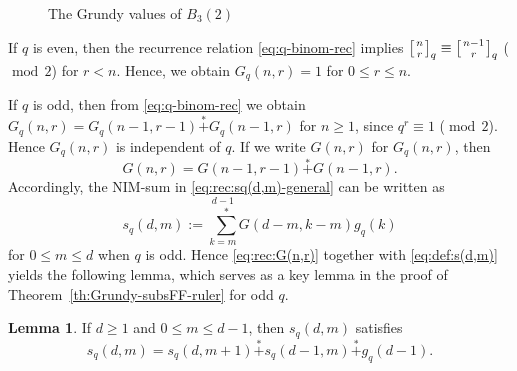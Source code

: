 \documentclass[a4paper,11pt]{amsart}
\theoremstyle{definition}
\newtheorem{lem}{Lemma}[section]
\newcommand{\nimadd}{\overset{*}{+}}
\newcommand{\nimsum}{{\sum}^{*}}
\numberwithin{equation}{section}
\def\MOD{\operatorname{mod}}
\def\qbinom#1#2#3{\left[{{#1}\atop{#2}}\right]_{#3}}
\begin{document}
\begin{figure}[htbp]
\caption{The Grundy values of $B_3(2)$}
\label{fig:B32g-ruler}
\end{figure}
%
%
%
If $q$ is even, then
the recurrence relation \eqref{eq:q-binom-rec} implies $\qbinom{n}{r}{q}\equiv\qbinom{n-1}{r}{q}$ ($\MOD\,2$)
for $r<n$. Hence, we obtain $G_{q}(n,r)=1$ for $0\leq r\leq n$.
%
\par
%
If $q$ is odd, 
then from \eqref{eq:q-binom-rec} 
we obtain $G_{q}(n,r)=G_{q}(n-1,r-1) \nimadd G_{q}(n-1,r)$
for $n\geq1$,
since $q^r\equiv 1$ ($\MOD\,2$).
Hence $G_{q}(n,r)$ is independent of $q$.
If we write $G(n,r)$ for $G_{q}(n,r)$,
then
\begin{equation}\label{eq:rec:G(n,r)}
	G(n,r)=G(n-1,r-1) \nimadd G(n-1,r).
\end{equation}
%
Accordingly,
the NIM-sum in \eqref{eq:rec:sq(d,m)-general} can be written as
%
\begin{equation}\label{eq:def:s(d,m)}
s_{q}(d,m):=\overset{d-1}{\underset{k=m}{\,\,\,\nimsum}} G(d-m,k-m) g_{q}(k)
\end{equation}
for $0\leq m\leq d$ when $q$ is odd.
%
Hence \eqref{eq:rec:G(n,r)} together with \eqref{eq:def:s(d,m)} yields the following lemma, 
which serves as a key lemma in the proof of Theorem~\ref{th:Grundy-subsFF-ruler} for odd $q$.
%
%
\begin{lem}\label{lem:red:s(d,m)}
%
If $d\geq 1$ and $0\leq m\leq d-1$,
then $s_{q}(d,m)$ satisfies 
%
\begin{equation}\label{eq:rec:s(d,m)}
s_{q}(d,m)=s_{q}(d,m+1)\nimadd s_{q}(d-1,m)\nimadd g_{q}(d-1).
\end{equation}
%
\end{lem}
\end{document}
